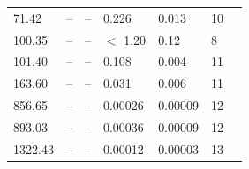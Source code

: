 \documentclass[11pt]{article}
\begin{document}
\begin{table}[htbp]
{\begin{tabular}{lllllll}
71.42       & -- & -- & 0.226     & 0.013     & 10        \\
100.35       & -- & -- & $<$ 1.20 & 0.12         & 8  \\
101.40       & -- & -- & 0.108   & 0.004   & 11             \\
163.60       & -- & -- & 0.031     & 0.006    & 11         \\
856.65       & -- & -- &   0.00026      &   0.00009        & 12 \\ 
893.03       & -- & -- &   0.00036     &  0.00009           & 12 \\
1322.43       & -- & -- & 0.00012    & 0.00003        & 13
\end{tabular}
}
\end{table}
\end{document}
